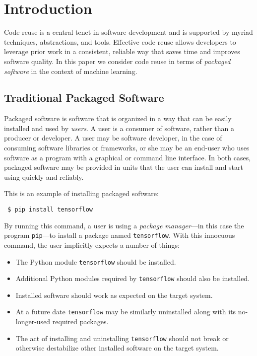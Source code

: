 \documentclass{article}
\begin{document}
\printAffiliationsAndNotice{}  %

\section{Introduction}

Code reuse is a central tenet in software development and is supported
by myriad techniques, abstractions, and tools. Effective code reuse
allows developers to leverage prior work in a consistent, reliable way
that saves time and improves software quality. In this paper we
consider code reuse in terms of \emph{packaged software} in the
context of machine learning.

\subsection{Traditional Packaged Software}

Packaged software is software that is organized in a way that can be
easily installed and used by \emph{users}. A user is a consumer of
software, rather than a producer or developer. A user may be software
developer, in the case of consuming software libraries or frameworks,
or she may be an end-user who uses software as a program with a
graphical or command line interface. In both cases, packaged software
may be provided in units that the user can install and start using
quickly and reliably.

This is an example of installing packaged software:

{\footnotesize
\begin{verbatim}
 $ pip install tensorflow
\end{verbatim}}

By running this command, a user is using a \emph{package manager}---in
this case the program \verb|pip|---to install a package named
\verb|tensorflow|. With this innocuous command, the user implicitly expects
a number of things:

\begin{itemize}
\item The Python module \verb|tensorflow| should be installed.
\item Additional Python modules required by \verb|tensorflow| should
  also be installed.
\item Installed software should work as expected on the target system.
\item At a future date \verb|tensorflow| may be similarly uninstalled
  along with its no-longer-used required packages.
\item The act of installing and uninstalling \verb|tensorflow| should
  not break or otherwise destabilize other installed software on the
  target system.
\end{itemize}
\end{document}
